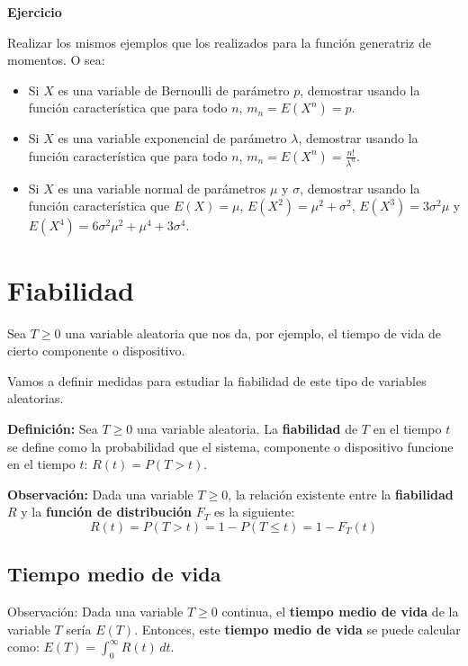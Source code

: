 \documentclass[]{book}
\begin{document}
\textbf{Ejercicio}

Realizar los mismos ejemplos que los realizados para la función generatriz de momentos. O sea:

\begin{itemize}
\item
  Si \(X\) es una variable de Bernoulli de parámetro \(p\), demostrar usando la función característica que para todo \(n\), \(m_n = E\left(X^n\right)=p\).
\item
  Si \(X\) es una variable exponencial de parámetro \(\lambda\), demostrar usando la función característica que para todo \(n\), \(m_n = E\left(X^n\right)=\frac{n!}{\lambda^n}\).
\item
  Si \(X\) es una variable normal de parámetros \(\mu\) y \(\sigma\), demostrar usando la función característica que \(E(X)=\mu\), \(E\left(X^2\right)=\mu^2+\sigma^2\), \(E\left(X^3\right)=3\sigma^2\mu\) y \(E\left(X^4\right)=6\sigma^2\mu^2+\mu^4+3\sigma^4\).
\end{itemize}

\hypertarget{fiabilidad}{%
\section{Fiabilidad}\label{fiabilidad}}

Sea \(T\geq 0\) una variable aleatoria que nos da, por ejemplo, el tiempo de vida de cierto componente o dispositivo.

Vamos a definir medidas para estudiar la fiabilidad de este tipo de variables aleatorias.

\textbf{Definición:}
Sea \(T\geq 0\) una variable aleatoria. La \textbf{fiabilidad} de \(T\) en el tiempo \(t\) se define como la probabilidad que el sistema, componente o dispositivo funcione en el tiempo \(t\): \(R(t)=P(T>t)\).

\textbf{Observación:}
Dada una variable \(T\geq 0\), la relación existente entre la \textbf{fiabilidad} \(R\) y la \textbf{función de distribución} \(F_T\) es la siguiente:
\[
R(t)=P(T>t)=1-P(T\leq t)=1-F_T (t)
\]

\hypertarget{tiempo-medio-de-vida}{%
\subsection{Tiempo medio de vida}\label{tiempo-medio-de-vida}}

Observación:
Dada una variable \(T\geq 0\) continua, el \textbf{tiempo medio de vida} de la variable \(T\) sería \(E(T)\). Entonces, este \textbf{tiempo medio de vida} se puede calcular como:
\(E(T)=\int_0^\infty R(t)\, dt.\)
\end{document}
